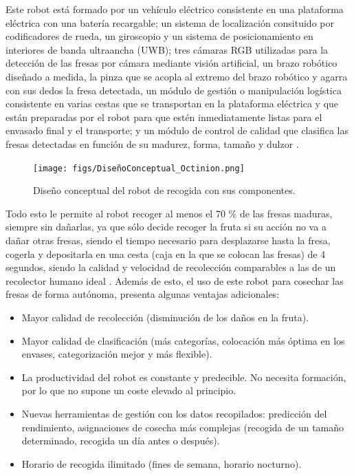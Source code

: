 Este robot está formado por un vehículo eléctrico consistente en una plataforma eléctrica con una batería recargable; un sistema de localización consituido por codificadores de rueda, un giroscopio y un sistema de posicionamiento en interiores de banda ultraancha (UWB); tres cámaras RGB utilizadas para la detección de las fresas por cámara mediante visión artificial, un brazo robótico diseñado a medida, la pinza que se acopla al extremo del brazo robótico y agarra con sus dedos la fresa detectada, un módulo de gestión o manipulación logística consistente en varias cestas que se transportan en la plataforma eléctrica y que están preparadas por el robot para que estén inmediatamente listas para el envasado final y el transporte; y un módulo de control de calidad que clasifica las fresas detectadas en función de su madurez, forma, tamaño y dulzor \cite{DePreter18}.

\begin{figure} [h!]
    \begin{center}
      \texttt{[image: figs/DiseñoConceptual\_Octinion.png]}
    \end{center}
    \caption{Diseño conceptual del robot de recogida con sus componentes.}
    \label{fig:DiseñoConceptual_Octinion}
\end{figure}
\pagebreak


Todo esto le permite al robot recoger al menos el 70 \% de las fresas maduras, siempre sin dañarlas, ya que sólo decide recoger la fruta si su acción no va a dañar otras fresas, siendo el tiempo necesario para desplazarse hasta la fresa, cogerla y depositarla en una cesta (caja en la que se colocan las
fresas) de 4 segundos, siendo la calidad y velocidad de recolección comparables a las de un recolector humano ideal \cite{DePreter18}. Además de esto, el uso de este robot para cosechar las fresas de forma autónoma, presenta algunas ventajas adicionales:

\begin{itemize}
    \item Mayor calidad de recolección (disminución de los daños en la fruta).
    \item Mayor calidad de clasificación (más categorías, colocación más óptima 								en los envases, categorización mejor y más flexible).
    \item La productividad del robot es constante y predecible. No necesita formación, por lo que no supone un coste elevado al principio.
    \item Nuevas herramientas de gestión con los datos recopilados: predicción del rendimiento, asignaciones de cosecha más complejas (recogida de un tamaño
determinado, recogida un día antes o después).
    \item Horario de recogida ilimitado (fines de semana, horario nocturno).
\end{itemize}



